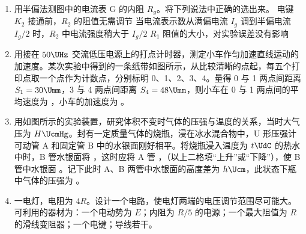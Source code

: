 \documentclass[\gkver]{gaokaozhenti}
\begin{document}
\begin{enumerate}
\item
用半偏法测图中的电流表 G 的内阻 $R_{g}$。将下列说法中正确的选出来。
\onepicture[w=5.19cm]{}
{电键 $K_{2}$ 接通前，$R_{2}$ 的阻值无需调节}
{当电流表示数从满偏电流 $I_{g}$ 调到半偏电流 $I_{g}/2$ 时，$R_{2}$ 中电流强度稍大于 $I_{g}/2$}
{$R_{1}$ 阻值的大小，对实验误差没有影响}

\item
用接在 $50\UHz$ 交流低压电源上的打点计时器，测定小车作匀加速直线运动的加速度。某次实验中得到的一条纸带如图所示，从比较清晰的点起，每五个打印点取一个点作为计数点，分别标明 0、1、2、3、4。量得 0 与 1 两点间距离 $S_{1} = 30\Umm$，3 与 4 两点间距离 $S_{4} = 48\Umm$，则小车在 0 与 1 两点间的平均速度为 \tkanswer{$0.30\Ums$}，小车的加速度为 \tkanswer{$0.60\Umsq$}。
\onepicture[align=right, w=11.00cm]{}

\item
用如图所示的实验装置，研究体积不变时气体的压强与温度的关系，当时大气压为 $H\UcmHg$。封有一定质量气体的烧瓶，浸在冰水混合物中，U 形压强计可动管 A 和固定管 B 中的水银面刚好相平。将烧瓶浸入温度为 $t\UdC$ 的热水中时，B 管水银面将 ，这时应将 A 管 ，（以上二格填“上升”或“下降”），使 B 管中水银面 。记下此时 A、B 两管中水银面的高度差为 $h\Ucm$，此状态下瓶中气体的压强为 。
\onepicture[align=right, w=4.89cm]{}

\item
一电灯，电阻为 $4R$。设计一个电路，使电灯两端的电压调节范围尽可能大。可利用的器材为：一个电动势为 $E$；内阻为 $R/5$ 的电源；一个最大阻值为 $R$ 的滑线变阻器；一个电键；导线若干。


\end{enumerate}
\end{document}
